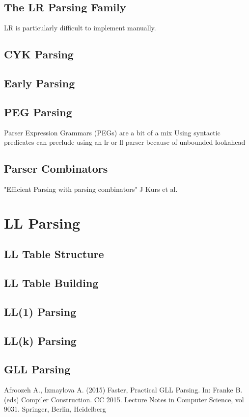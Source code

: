 \documentclass{book}
\begin{document}
\section{The LR Parsing Family}
LR is particularly difficult to implement manually.

\section{CYK Parsing}

\section{Early Parsing}

\section{PEG Parsing}
Parser Expression Grammars (PEGs) are a bit of a mix
    Using syntactic predicates can preclude using an lr or ll parser because of unbounded lookahead

\section{Parser Combinators}
"Efficient Parsing with parsing combinators" J Kurs et al.


%
%
\chapter{LL Parsing}
\section{LL Table Structure}
\section{LL Table Building}

\section{LL(1) Parsing}

\section{LL(k) Parsing}

\section{GLL Parsing}
Afroozeh A., Izmaylova A. (2015) Faster, Practical GLL Parsing. In: Franke B. (eds) Compiler Construction. CC 2015. Lecture Notes in Computer Science, vol 9031. Springer, Berlin, Heidelberg
\end{document}
